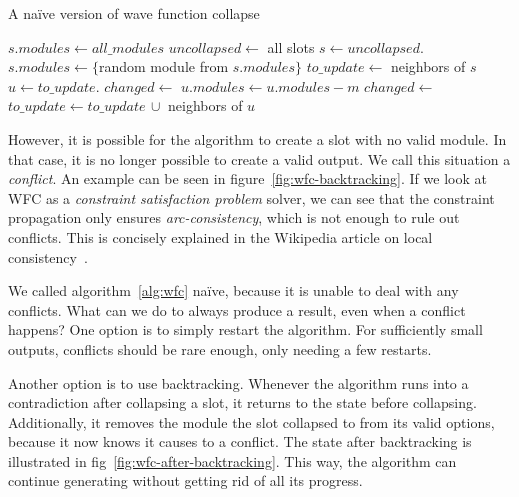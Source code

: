 \begin{algorithm}[H]
    \caption{A na\"{i}ve version of wave function collapse}
    \label{alg:wfc}
    \begin{algorithmic}[1]
         
        \State $s.modules \gets all\_modules$
        \EndFor
        \Statex
        \State $uncollapsed \gets$ all slots
        \State $s \gets uncollapsed$. 
        \State $s.modules \gets \{$random module from $s.modules\}$
        \Statex
        \State $to\_update \gets$ neighbors of $s$ 
        \State $u \gets to\_update$.
        \Statex
        \State $changed \gets$ 
         
        \State $u.modules \gets u.modules - m$
        \State $changed \gets$ 
        \EndIf
        \EndFor
        \Statex
         
        \State $to\_update \gets to\_update\,\cup$ neighbors of $u$
        \EndIf
        \Statex
        \EndWhile
        \EndWhile
        \Statex
    \end{algorithmic}
\end{algorithm}

However, it is possible for the algorithm to create a slot with no valid module.
In that case, it is no longer possible to create a valid output.
We call this situation a \emph{conflict}.
An example can be seen in figure~\ref{fig:wfc-backtracking}.
If we look at WFC as a \emph{constraint satisfaction problem} solver, we can see that the constraint propagation only ensures \emph{arc-consistency}, which is not enough to rule out conflicts.
This is concisely explained in the Wikipedia article on local consistency~\cite{LocalConsistencyWiki}.

We called algorithm~\ref{alg:wfc} na\"{i}ve, because it is unable to deal with any conflicts.
What can we do to always produce a result, even when a conflict happens?
One option is to simply restart the algorithm.
For sufficiently small outputs, conflicts should be rare enough, only needing a few restarts.

Another option is to use backtracking.
Whenever the algorithm runs into a contradiction after collapsing a slot, it returns to the state before collapsing.
Additionally, it removes the module the slot collapsed to from its valid options, because it now knows it causes to a conflict.
The state after backtracking is illustrated in fig~\ref{fig:wfc-after-backtracking}.
This way, the algorithm can continue generating without getting rid of all its progress.

